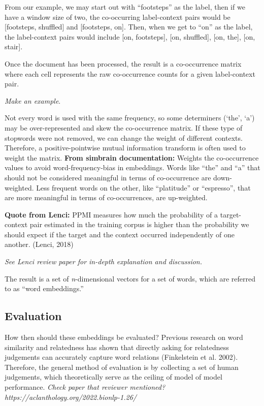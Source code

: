 From our example, we may start out with ``footsteps'' as the label, then if we have a window size of two, the co-occurring label-context pairs would be [footsteps, shuffled] and [footsteps, on].
Then, when we get to ``on'' as the label, the label-context pairs would include [on, footsteps], [on, shuffled], [on, the], [on, stair].

Once the document has been processed, the result is a co-occurrence matrix where each cell represents the raw co-occurrence counts for a given label-context pair.

\textit{Make an example}.

Not every word is used with the same frequency, so some determiners (`the', `a') may be over-represented and skew the co-occurrence matrix. If these type of stopwords were not removed, we can change the weight of different contexts. Therefore, a positive-pointwise mutual information transform is often used to weight the matrix. 
\textbf{From simbrain documentation:} Weights the co-occurrence values to avoid word-frequency-bias in embeddings. Words like ``the'' and ``a'' that should not be considered meaningful in terms of co-occurrence are down-weighted. Less frequent words on the other, like ``platitude'' or ``espresso'', that are more meaningful in terms of co-occurrences, are up-weighted.

\textbf{Quote from Lenci:} PPMI measures how much the probability of a target-context pair estimated in the training corpus is higher than the probability we should expect if the target and the context occurred independently of one another. (Lenci, 2018)

\textit{See Lenci review paper for in-depth explanation and discussion.}

The result is a set of \textit{n}-dimensional vectors for a set of words, which are referred to as ``word embeddings.''

\subsection{Evaluation}

How then should these embeddings be evaluated? 
Previous research on word similarity and relatedness has shown that directly asking for relatedness judgements can accurately capture word relations (Finkelstein et al. 2002).
Therefore, the general method of evaluation is by collecting a set of human judgements, which theoretically serve as the ceiling of model of model performance. \textit{Check paper that reviewer mentioned? https://aclanthology.org/2022.bionlp-1.26/}

